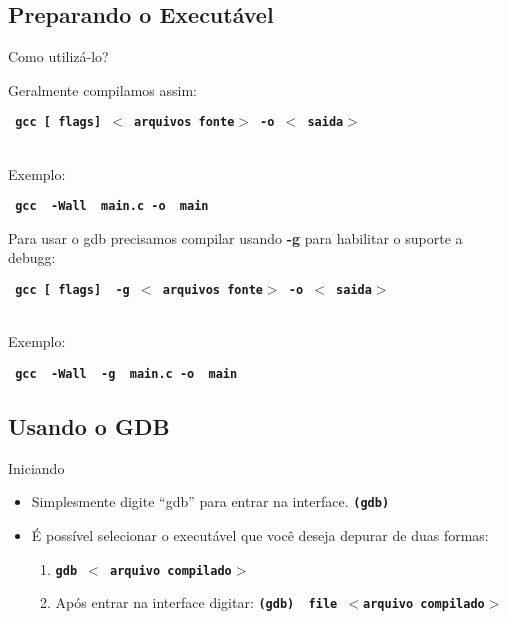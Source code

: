 \subsection{ Preparando o Executável }
\frame{\tableofcontents[
    currentsection,
    currentsubsection,
    subsectionstyle=show/shaded/hide
]}
\begin{frame}[fragile]{Como utilizá-lo?}

Geralmente compilamos assim:

\begin{center}
    \small
    \texttt{ \textbf{ gcc [{\color{blue} flags}]  $<${\color{dartmouthgreen} arquivos fonte}$>$ -o $<${\color{dartmouthgreen} saida}$>$}}
\end{center}
\\[2.0em]
Exemplo:
\begin{center}
    \small
    \texttt{ \textbf{ gcc {\color{blue} -Wall}  {\color{dartmouthgreen} main.c} -o {\color{dartmouthgreen} main} }}
\end{center}

Para usar o gdb precisamos compilar usando {\color{red} \textbf{-g}} para habilitar o suporte a debugg:

\begin{center}
    \small
    \texttt{ \textbf{ gcc [{\color{blue} flags}] {\color{red} -g} $<${\color{dartmouthgreen} arquivos fonte}$>$ -o $<${\color{dartmouthgreen} saida}$>$}}
\end{center}
\\[2.0em]
Exemplo:
\begin{center}
    \small
    \texttt{ \textbf{ gcc {\color{blue} -Wall}  {\color{red} -g}  {\color{dartmouthgreen} main.c} -o {\color{dartmouthgreen} main} }}
\end{center}

\end{frame}

\subsection{ Usando o GDB }
\frame{\tableofcontents[
    currentsection,
    currentsubsection,
    subsectionstyle=show/shaded/hide
]}
\begin{frame}{Iniciando}
    \begin{itemize}
        \item Simplesmente digite ``gdb'' para entrar na interface. \texttt{\textbf{(gdb)}}
        \item É possível selecionar o executável que você deseja depurar de duas formas:
        \begin{enumerate}
            \item \textbf{ \texttt{gdb $<${\color{dartmouthgreen} arquivo compilado}$>$} }
            \item Após entrar na interface digitar: \textbf{\texttt{(gdb) {\color{blue} file} $<${\color{dartmouthgreen}arquivo compilado}$>$}}
        \end{enumerate}
    \end{itemize}
\end{frame}


